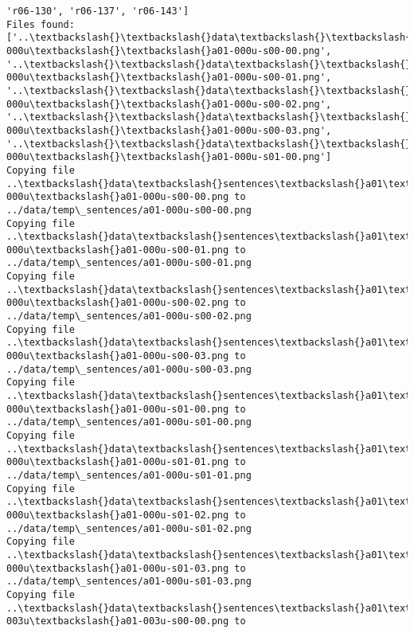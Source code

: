 \documentclass[11pt]{article}
\begin{document}
\begin{Verbatim}[commandchars=\\\{\}]
'r06-130', 'r06-137', 'r06-143']
Files found: ['..\textbackslash{}\textbackslash{}data\textbackslash{}\textbackslash{}sentences\textbackslash{}\textbackslash{}a01\textbackslash{}\textbackslash{}a01-000u\textbackslash{}\textbackslash{}a01-000u-s00-00.png',
'..\textbackslash{}\textbackslash{}data\textbackslash{}\textbackslash{}sentences\textbackslash{}\textbackslash{}a01\textbackslash{}\textbackslash{}a01-000u\textbackslash{}\textbackslash{}a01-000u-s00-01.png',
'..\textbackslash{}\textbackslash{}data\textbackslash{}\textbackslash{}sentences\textbackslash{}\textbackslash{}a01\textbackslash{}\textbackslash{}a01-000u\textbackslash{}\textbackslash{}a01-000u-s00-02.png',
'..\textbackslash{}\textbackslash{}data\textbackslash{}\textbackslash{}sentences\textbackslash{}\textbackslash{}a01\textbackslash{}\textbackslash{}a01-000u\textbackslash{}\textbackslash{}a01-000u-s00-03.png',
'..\textbackslash{}\textbackslash{}data\textbackslash{}\textbackslash{}sentences\textbackslash{}\textbackslash{}a01\textbackslash{}\textbackslash{}a01-000u\textbackslash{}\textbackslash{}a01-000u-s01-00.png']
Copying file ..\textbackslash{}data\textbackslash{}sentences\textbackslash{}a01\textbackslash{}a01-000u\textbackslash{}a01-000u-s00-00.png to
../data/temp\_sentences/a01-000u-s00-00.png
Copying file ..\textbackslash{}data\textbackslash{}sentences\textbackslash{}a01\textbackslash{}a01-000u\textbackslash{}a01-000u-s00-01.png to
../data/temp\_sentences/a01-000u-s00-01.png
Copying file ..\textbackslash{}data\textbackslash{}sentences\textbackslash{}a01\textbackslash{}a01-000u\textbackslash{}a01-000u-s00-02.png to
../data/temp\_sentences/a01-000u-s00-02.png
Copying file ..\textbackslash{}data\textbackslash{}sentences\textbackslash{}a01\textbackslash{}a01-000u\textbackslash{}a01-000u-s00-03.png to
../data/temp\_sentences/a01-000u-s00-03.png
Copying file ..\textbackslash{}data\textbackslash{}sentences\textbackslash{}a01\textbackslash{}a01-000u\textbackslash{}a01-000u-s01-00.png to
../data/temp\_sentences/a01-000u-s01-00.png
Copying file ..\textbackslash{}data\textbackslash{}sentences\textbackslash{}a01\textbackslash{}a01-000u\textbackslash{}a01-000u-s01-01.png to
../data/temp\_sentences/a01-000u-s01-01.png
Copying file ..\textbackslash{}data\textbackslash{}sentences\textbackslash{}a01\textbackslash{}a01-000u\textbackslash{}a01-000u-s01-02.png to
../data/temp\_sentences/a01-000u-s01-02.png
Copying file ..\textbackslash{}data\textbackslash{}sentences\textbackslash{}a01\textbackslash{}a01-000u\textbackslash{}a01-000u-s01-03.png to
../data/temp\_sentences/a01-000u-s01-03.png
Copying file ..\textbackslash{}data\textbackslash{}sentences\textbackslash{}a01\textbackslash{}a01-003u\textbackslash{}a01-003u-s00-00.png to

\end{Verbatim}
\end{document}
